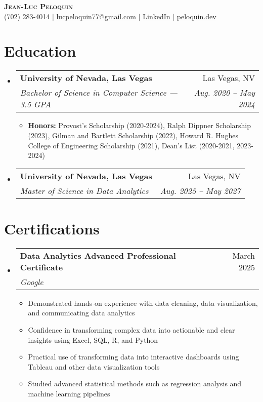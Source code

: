 \documentclass[letterpaper,11pt]{article}
\makeatletter
\newcommand{\resumeItem}[1]{
  \item\small{
    {#1 \vspace{-2pt}}
  }
}
\newcommand{\resumeSubheading}[4]{
  \vspace{-2pt}\item
    \begin{tabular*}{0.97\textwidth}[t]{l@{\extracolsep{\fill}}r}
      \textbf{#1} & #2 \\
      \textit{\small#3} & \textit{\small #4} \\
    \end{tabular*}\vspace{-7pt}
}
\newcommand{\resumeSubHeadingListStart}{\begin{itemize}[leftmargin=0.15in, label={}]}
\newcommand{\resumeSubHeadingListEnd}{\end{itemize}}
\newcommand{\resumeItemListStart}{\begin{itemize}}
\newcommand{\resumeItemListEnd}{\end{itemize}\vspace{-5pt}}
\makeatother
\begin{document}

\begin{center}
    \textbf{\Huge \scshape Jean-Luc Peloquin} \\ \vspace{1pt}
    \small (702) 283-4014 $|$ \href{mailto:lucpeloquin77@gmail.com}{lucpeloquin77@gmail.com} $|$ 
    \href{https://www.linkedin.com/in/jean-luc-peloquin/}{LinkedIn} $|$
    \href{https://peloquin.dev/}{peloquin.dev}
\end{center}


\section{Education}
  \resumeSubHeadingListStart
    \resumeSubheading
      {University of Nevada, Las Vegas}{Las Vegas, NV}
      {Bachelor of Science in Computer Science — 3.5 GPA}{Aug. 2020 -- May 2024}
      \resumeItemListStart
        \resumeItem{\textbf{Honors:} Provost's Scholarship (2020-2024), Ralph Dippner Scholarship (2023), Gilman and Bartlett Scholarship (2022), Howard R. Hughes College of Engineering Scholarship (2021), Dean's List (2020-2021, 2023-2024)}
      \resumeItemListEnd
      \resumeSubheading
      {University of Nevada, Las Vegas}{Las Vegas, NV}
      {Master of Science in Data Analytics}{Aug. 2025 -- May 2027}
  \resumeSubHeadingListEnd
  
\section{Certifications}
  \resumeSubHeadingListStart
    \resumeSubheading
      {Data Analytics Advanced Professional Certificate}{March 2025}
      {Google}{}
      \resumeItemListStart
        \resumeItem{Demonstrated hands-on experience with data cleaning, data visualization, and communicating data analytics}
        \resumeItem{Confidence in transforming complex data into actionable and clear insights using Excel, SQL, R, and Python}
        \resumeItem{Practical use of transforming data into interactive dashboards using Tableau and other data visualization tools}
        \resumeItem{Studied advanced statistical methods such as regression analysis and machine learning pipelines}
      \resumeItemListEnd
  \resumeSubHeadingListEnd
  
\end{document}

